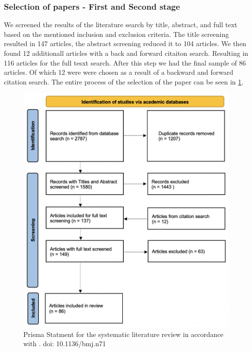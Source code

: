 \subsubsection{Selection of papers - First and Second stage}

We screened the results of the literature search by title, abstract, and full text based on the mentioned inclusion and exclusion criteria. The title screening resulted in 147 articles, the abstract screening reduced it to 104 articles. We then found 12 additionall articles with a back and forward citaiton search. Resulting in 116 articles for the full tesxt search. After this step we had the final sample of 86 articles. Of which 12 were  were chosen as a result of a backward and forward citation search. The entire process of the selection of the paper can be seen in \ref{fig: Prisma Statement}.

\begin{figure}
    \centering
    \includegraphics[width=\textwidth]{reports/figures/Prisma Statement.png}
    \caption{Prisma Statment for the systematic literature review in accordance with \cite{moher_preferred_2009} . doi: 10.1136/bmj.n71}
    \label{fig: Prisma Statement}
\end{figure}


